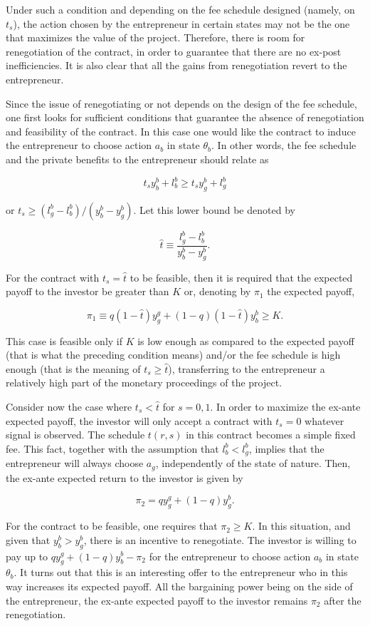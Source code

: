 \documentclass[11pt,a4paper]{article}
\begin{document}
Under such a condition and depending on the fee schedule designed (namely, on \(t_s\)), the action
chosen by the entrepreneur in certain states may not be the one that maximizes the value of the
project. Therefore, there is room for renegotiation of the contract, in order to guarantee that
there are no ex-post inefficiencies. It is also clear that all the gains from renegotiation revert
to the entrepreneur.

Since the issue of renegotiating or not depends on the design of the fee schedule, one first looks
for sufficient conditions that guarantee the absence of renegotiation and feasibility of the
contract. In this case one would like the contract to induce the entrepreneur to choose action
\(a_b\) in state \(\theta_b\). In other words, the fee schedule and the private benefits to the
entrepreneur should relate as

\[t_s y^b_b + l^b_b \geq t_s y^b_g + l^b_g\]

or \(t_s \geq (l^b_g - l^b_b)/(y^b_b - y^b_g)\). Let this lower bound be denoted by

\[\hat t \equiv \frac{l^b_g - l^b_b}{y^b_b - y^b_g}.\]

For the contract with \(t_s = \hat t\) to be feasible, then it is required that the expected payoff
to the investor be greater than \(K\) or, denoting by \(\pi_1\) the expected payoff,

\[\pi_1 \equiv q(1 - \hat t) y^g_g + (1 - q)(1 - \hat t) y^b_b \geq K.\]

This case is feasible only if \(K\) is low enough as compared to the expected payoff (that is what
the preceding condition means) and/or the fee schedule is high enough (that is the meaning of
\(t_s \geq \hat t\)), transferring to the entrepreneur a relatively high part of the monetary
proceedings of the project.

Consider now the case where \(t_s < \hat t\) for \(s = 0, 1\). In order to maximize the ex-ante
expected payoff, the investor will only accept a contract with \(t_s = 0\) whatever signal is
observed. The schedule \(t(r, s)\) in this contract becomes a simple fixed fee. This fact, together
with the assumption that \(l^b_b < l^b_g\), implies that the entrepreneur will always choose
\(a_g\), independently of the state of nature. Then, the ex-ante expected return to the investor is
given by

\[\pi_2 = q y^g_g + (1 - q) y^b_g.\]

For the contract to be feasible, one requires that \(\pi_2 \geq K\). In this situation, and given
that \(y^b_b > y^b_g\), there is an incentive to renegotiate. The investor is willing to pay up to
\(q y^g_g + (1 - q) y^b_b - \pi_2\) for the entrepreneur to choose action \(a_b\) in state
\(\theta_b\). It turns out that this is an interesting offer to the entrepreneur who in this way
increases its expected payoff. All the bargaining power being on the side of the entrepreneur, the
ex-ante expected payoff to the investor remains \(\pi_2\) after the renegotiation.
\end{document}
